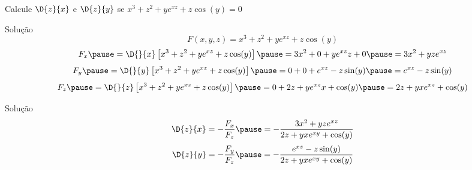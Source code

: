 \addtocounter{exemplo}{1}
\begin{question}
  Calcule \; \(\D{z}{x}\) e \(\D{z}{y}\) \; se \;
  \(x^3 + z^2 + ye^{xz} + z\cos(y) = 0\)
\end{question}

\begin{resolution}{Solução}
  \[
    F(x, y, z) = x^3 + z^2 + ye^{xz} + z\cos(y)
  \]
  \pause
  \[
    F_x
    \pause
    = \D{}{x}\left[x^3 + z^2 + ye^{xz} + z\cos(y)\right]
    \pause
    = 3x^2 + 0 + ye^{xz}z + 0
    \pause
    = 3x^2 + yze^{xz}
  \]
  \pause
  \[
    F_y
    \pause
    = \D{}{y}\left[x^3 + z^2 + ye^{xz} + z\cos(y)\right]
    \pause
    = 0 + 0 + e^{xz} -z\sin(y)
    \pause
    = e^{xz} -z\sin(y)
  \]
  \pause
  \[
    F_z
    \pause
    = \D{}{z}\left[x^3 + z^2 + ye^{xz} + z\cos(y)\right]
    \pause
    = 0 + 2z + ye^{xz}x + \cos(y)
    \pause
    = 2z + yxe^{xz} + \cos(y)
  \]
\end{resolution}

\begin{resolution}{Solução}
  \[
    \D{z}{x}
    = -\frac{F_x}{F_z}
    \pause
    = -\frac{3x^2 + yze^{xz}}{2z + yxe^{xy} + \cos(y)}
  \]
  \pause
  \[
    \D{z}{y}
    = -\frac{F_y}{F_z}
    \pause
    = -\frac{e^{xz} -z\sin(y)}{2z + yxe^{xy} + \cos(y)}
  \]
\end{resolution}

